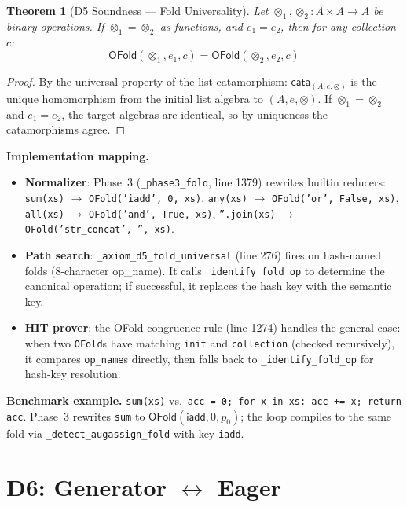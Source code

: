 \documentclass[11pt,a4paper]{report}
\theoremstyle{definition}
\theoremstyle{plain}
\newtheorem{theorem}[definition]{Theorem}
\newcommand{\cata}{\mathsf{cata}}
\begin{document}
\begin{theorem}[D5 Soundness --- Fold Universality]
\label{thm:d5-sound}
Let $\otimes_1, \otimes_2 : A \times A \to A$ be binary operations.
If $\otimes_1 = \otimes_2$ as functions, and $e_1 = e_2$, then
for any collection $c$:
\[
  \mathsf{OFold}(\otimes_1, e_1, c) = \mathsf{OFold}(\otimes_2, e_2, c)
\]
\end{theorem}

\begin{proof}
By the universal property of the list catamorphism:
$\cata_{(A, e, \otimes)}$ is the unique homomorphism from the
initial list algebra to $(A, e, \otimes)$.  If $\otimes_1 = \otimes_2$
and $e_1 = e_2$, the target algebras are identical, so by uniqueness
the catamorphisms agree.
\end{proof}

\textbf{Implementation mapping.}
\begin{itemize}
  \item \textbf{Normalizer}: Phase~3 (\texttt{\_phase3\_fold},
    line 1379) rewrites builtin reducers:
    \texttt{sum(xs)} $\to$ \texttt{OFold('iadd', 0, xs)},
    \texttt{any(xs)} $\to$ \texttt{OFold('or', False, xs)},
    \texttt{all(xs)} $\to$ \texttt{OFold('and', True, xs)},
    \texttt{''.join(xs)} $\to$ \texttt{OFold('str\_concat', '', xs)}.
  \item \textbf{Path search}: \texttt{\_axiom\_d5\_fold\_universal}
    (line 276) fires on hash-named folds (8-character op\_name).
    It calls \texttt{\_identify\_fold\_op} to determine the canonical
    operation; if successful, it replaces the hash key with the
    semantic key.
  \item \textbf{HIT prover}: the OFold congruence rule (line 1274)
    handles the general case: when two \texttt{OFold}s have matching
    \texttt{init} and \texttt{collection} (checked recursively),
    it compares \texttt{op\_name}s directly, then falls back to
    \texttt{\_identify\_fold\_op} for hash-key resolution.
\end{itemize}

\textbf{Benchmark example.}
\texttt{sum(xs)} vs.\ \texttt{acc = 0; for x in xs: acc += x;
return acc}.  Phase~3 rewrites \texttt{sum} to
$\mathsf{OFold}(\mathsf{iadd}, 0, p_0)$; the loop compiles to
the same fold via \texttt{\_detect\_augassign\_fold} with key
\texttt{iadd}.


\section{D6: Generator $\leftrightarrow$ Eager}
\label{sec:d6}
\end{document}
